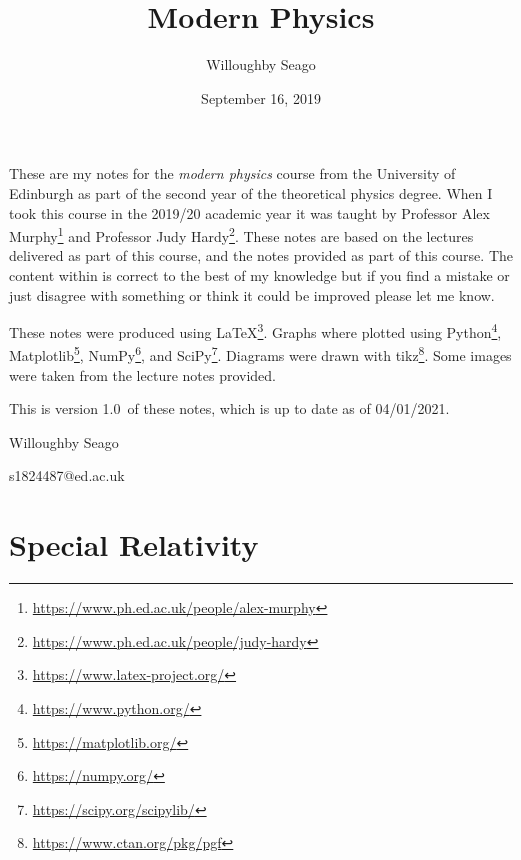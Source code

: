 \documentclass{article}
\title{Modern Physics}
\date{September 16, 2019}
\author{Willoughby Seago}
\newcommand{\notesVersion}{1.0}
\newcommand{\notesDate}{04/01/2021}
\begin{document}
    \maketitle
    These are my notes for the \textit{modern physics} course from the University of Edinburgh as part of the second year of the theoretical physics degree.
    When I took this course in the 2019/20 academic year it was taught by Professor Alex Murphy\footnote{\url{https://www.ph.ed.ac.uk/people/alex-murphy}} and Professor Judy Hardy\footnote{\url{https://www.ph.ed.ac.uk/people/judy-hardy}}.
    These notes are based on the lectures delivered as part of this course, and the notes provided as part of this course.
    The content within is correct to the best of my knowledge but if you find a mistake or just disagree with something or think it could be improved please let me know.
    
    These notes were produced using \LaTeX\footnote{\url{https://www.latex-project.org/}}.
    Graphs where plotted using Python\footnote{\url{https://www.python.org/}}, Matplotlib\footnote{\url{https://matplotlib.org/}}, NumPy\footnote{\url{https://numpy.org/}}, and SciPy\footnote{\url{https://scipy.org/scipylib/}}.
    Diagrams were drawn with tikz\footnote{\url{https://www.ctan.org/pkg/pgf}}.
    Some images were taken from the lecture notes provided.
    
    This is version \notesVersion~of these notes, which is up to date as of \notesDate.
    \begin{flushright}
        Willoughby Seago
        
        s1824487@ed.ac.uk
    \end{flushright}
    \clearpage
    \tableofcontents
    \listoffigures
    \listoftables
    \clearpage
    
    \part{Special Relativity}
\end{document}
